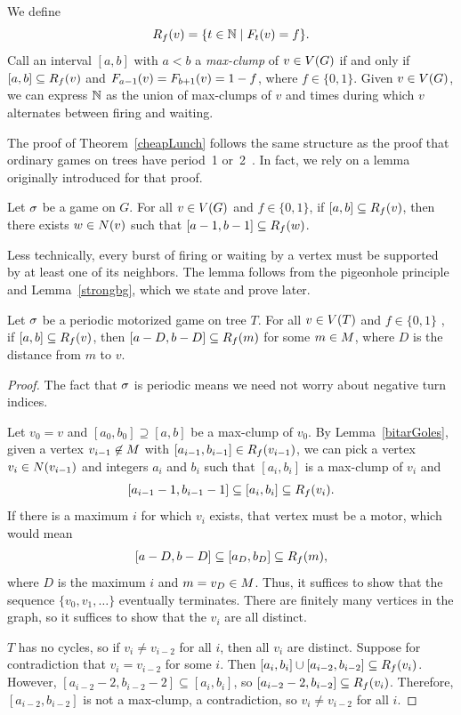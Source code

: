 We define
\[
  \pat{v}{f} = \set{t \in \nats}{\firing{v}{t} = f}.
\]
Call an interval $[a, b]$ with $a < b$ a \emph{max-clump} of $v \in \V$ if and
only if $[a, b] \subseteq \pat{v}{f}$ and $\firing{v}{a-1} = \firing{v}{b+1} =
1-f$, where $f \in \{0,1\}$. Given $v \in \V$, we can express $\nats$ as the
union of max-clumps of $v$ and times during which $v$ alternates between firing
and waiting.

The proof of Theorem~\ref{cheapLunch} follows the same structure as the proof
that ordinary games on trees have period~1 or~2~\cite{bitarGoles}. In fact, we
rely on a lemma originally introduced for that proof.

\begin{lem} \label{bitarGoles}
Let $\s$ be a game on $G$. For all $v \in \V$ and $f \in \{0,1\}$, if $[a, b]
\subseteq \pat{v}{f}$, then there exists $w \in \N{v}$ such that $[a-1, b-1]
\subseteq \pat{w}{f}$.
\end{lem}

Less technically, every burst of firing or waiting by a vertex must be
supported by at least one of its neighbors. The lemma follows from the
pigeonhole principle and Lemma~\ref{strongbg}, which we state and prove later.

\begin{thm} \label{cheapLunch}
Let $\s$ be a periodic motorized game on tree $T$. For all $v \in \V[T]$ and $f
\in \{0,1\}$ , if $[a, b] \subseteq \pat{v}{f}$, then $[a-D, b-D] \subseteq
\pat{m}{f}$ for some $m \in \mots$, where $D$ is the distance from $m$ to $v$.
\end{thm}

\begin{proof}
The fact that $\s$ is periodic means we need not worry about negative turn
indices.

Let $v_0 = v$ and $[a_0, b_0] \supseteq [a, b]$ be a max-clump of $v_0$. By
Lemma~\ref{bitarGoles}, given a vertex $v_{i-1} \not\in \mots$ with $[a_{i-1},
  b_{i-1}] \in \pat{v_{i-1}}{f}$, we can pick a vertex $v_i \in \N{v_{i-1}}$
and integers $a_i$ and $b_i$ such that $[a_i, b_i]$ is a max-clump of $v_i$ and
\[
  [a_{i-1} - 1, b_{i-1} - 1] \subseteq [a_i, b_i] \subseteq \pat{v_i}{f}.
\]
If there is a maximum $i$ for which $v_i$ exists, that vertex must be a motor,
which would mean
\[
  [a-D, b-D] \subseteq [a_D, b_D] \subseteq \pat{m}{f},
\]
where $D$ is the maximum $i$ and $m = v_D \in \mots$. Thus, it suffices to show
that the sequence $\{v_0, v_1, \ldots\}$ eventually terminates. There are
finitely many vertices in the graph, so it suffices to show that the $v_i$ are
all distinct.

$T$ has no cycles, so if $v_i \neq v_{i-2}$ for all $i$, then all $v_i$ are
distinct. Suppose for contradiction that $v_i = v_{i-2}$ for some $i$. Then
$[a_i, b_i] \cup [a_{i-2}, b_{i-2}] \subseteq \pat{v_i}{f}$. However, $[a_{i-2}
  - 2, b_{i-2} - 2] \subseteq [a_i, b_i]$, so $[a_{i-2} - 2, b_{i-2}] \subseteq
\pat{v_i}{f}$. Therefore, $[a_{i-2}, b_{i-2}]$ is not a max-clump, a
contradiction, so $v_i \neq v_{i-2}$ for all $i$.
\end{proof}

